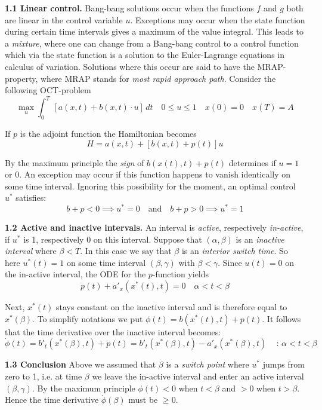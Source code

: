 \documentclass{amsart}
\begin{document}
\bigskip

\noindent
{\bf 1.1 Linear control.} Bang-bang solutions 
occur  when the  
functions $f$ and $g$ both are linear in the control variable $u$. 
Exceptions may occur when
the state function
during  certain time intervals 
gives a maximum of the value integral.
This leads to a \emph{mixture}, where one can change from a Bang-bang
control to a control function which via the state function is a solution to the Euler-Lagrange equations in calculus of variation.
Solutions where this occur are  said to have the MRAP-property, where MRAP stands for \emph{most rapid approach path}.
Consider the following
OCT-problem
\[
\max_u\int_0^T\,[a(x,t)+b(x,t)\cdot u]\,dt\quad
0\leq u\leq 1\quad x(0)=0\quad x(T)=A
\]





\noindent
If $p$ is the adjoint function the Hamiltonian becomes
\[ 
H=
a(x,t)+[b(x,t)+ p(t)]u
\]


\noindent 
By the maximum principle  the \emph{sign} of 
$b(x(t),t)+p(t)$ determines if $u=1$ or 0.
An exception may occur if this function happens to vanish identically
on some time interval. Ignoring this possibility for the moment, an
optimal control $u^*$ satisfies:
\[
b+p<0\implies u^*=0\quad\text{and}\quad  b+p>0\implies u^*=1\tag{*}
\]


\noindent
{\bf 1.2 Active and inactive intervals.}
An interval is \emph{active}, respectively \emph{in-active}, if $u^*$ is 1, 
respectively 0
on this interval. 
Suppose  that $(\alpha,\beta)$ is an \emph{inactive interval} where $\beta<T$.
In this case we say that
$\beta$ is an \emph{interior
switch time}. So here $u^*(t)=1$ on some  time interval
$(\beta,\gamma)$ with $\beta<\gamma$.
Since $u(t)=0$ on the in-active interval, the ODE for the $p$-function yields
\[
\dot p(t)+a'_x(x^*(t),t)=0\quad \alpha<t<\beta
\]

\noindent
Next, $x^*(t)$ stays constant on the inactive interval 
and is therefore equal to $x^*(\beta)$. 
To simplify notations we put $\phi(t)= b(x^*(t),t)+p(t)$.
It follows that the time derivative over the inactive interval becomes:
\medskip
\[
\dot\phi(t)=b'_t(x^*(\beta),t)+\dot p(t)=
b'_t(x^*(\beta),t)-a'_x(x^*(\beta),t)
\quad\,\colon\, \alpha<t<\beta
\]

\medskip

\noindent
{\bf  1.3 Conclusion} Above we assumed that
$\beta$ is a \emph{switch point} where $u^*$
jumps from zero to 1, i.e. at time $\beta$ we leave the in-active
interval and enter an active interval $(\beta,\gamma)$.
By the maximum principle 
$\phi(t)<0$ when $t<\beta$ and $>0$ when $t>\beta$. Hence the
time derivative $\dot\phi(\beta)$ must be $\geq 0$.
\bigskip
\end{document}
